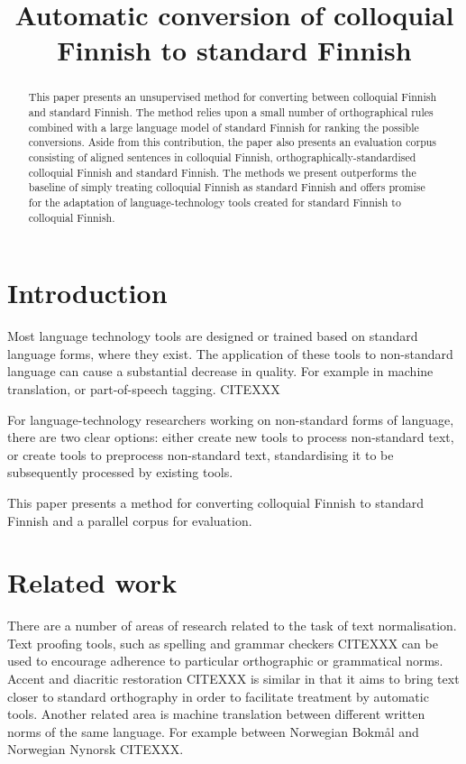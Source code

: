 \documentclass[11pt]{article}
\title{Automatic conversion of colloquial Finnish to standard Finnish}
\author{}
\date{}
\begin{document}
\maketitle
\begin{abstract}
  This paper presents an unsupervised method for converting between colloquial Finnish
  and standard Finnish. The method relies upon a small number of orthographical rules
  combined with a large language model of standard Finnish for ranking the possible 
  conversions. Aside from this contribution, the paper also presents an evaluation
  corpus consisting of aligned sentences in colloquial Finnish, orthographically-standardised
  colloquial Finnish and standard Finnish. The methods we present outperforms the baseline
  of simply treating colloquial Finnish as standard Finnish and offers promise for the adaptation
  of language-technology tools created for standard Finnish to colloquial Finnish.
\end{abstract}

\section{Introduction}

Most language technology tools are designed or trained based on standard language 
forms, where they exist. The application of these tools to non-standard
language can cause a substantial decrease in quality. For example in machine translation,
or part-of-speech tagging. CITEXXX

For language-technology researchers working on non-standard forms of language, there are 
two clear options: either create new tools to process non-standard text,
  or create tools to preprocess non-standard text, standardising it to be subsequently processed
 by existing tools.

This paper presents a method for converting colloquial Finnish to standard Finnish and 
a parallel corpus for evaluation.

\section{Related work}

There are a number of areas of research related to the task of text normalisation. Text
proofing tools, such as spelling and grammar checkers CITEXXX can be used to encourage adherence
to particular orthographic or grammatical norms. Accent and diacritic restoration CITEXXX is similar
in that it aims to bring text closer to standard orthography in order to facilitate treatment by 
automatic tools. Another related area is machine translation between different written norms of 
the same language. For example between Norwegian Bokmål and Norwegian Nynorsk CITEXXX.
\end{document}
